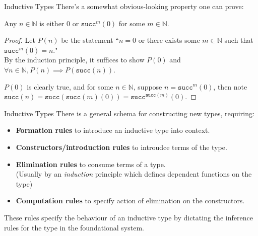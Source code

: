 \documentclass[10pt, aspectratio=169]{beamer}
\newcommand{\U}{\mathcal{U}}
\newcommand{\Prod}[2]{\prod_{(#1)}{#2}}
\newcommand{\0}{\mathbf{0}}
\newcommand{\1}{\mathbf{1}}
\newcommand{\2}{\mathbf{2}}
\newcommand{\N}{\mathbb{N}}
\begin{document}
\begin{frame}{Inductive Types}
  There's a somewhat obvious-looking property one can prove:
  \begin{theorem}
    Any $n \in \N$ is either $0$ or $\mathtt{succ}^m(0)$ for some $m \in \N$.
  \end{theorem}
  \begin{proof}
    Let $P(n)$ be the statement ``$n = 0$ or there exists some $m \in \N$ such that $\mathtt{succ}^m(0) = n.$" \\
    By the induction principle, it suffices to show $P(0)$ and $\forall n \in \N, P(n) \implies P(\mathtt{succ}(n))$.

    $P(0)$ is clearly true, and for some $n \in \N$, suppose $n = \mathtt{succ}^m(0)$, then note $\mathtt{succ}(n) = \mathtt{succ}(\mathtt{succ}(m)(0)) = \mathtt{succ}^{\mathtt{succ}(m)}(0)$.
  \end{proof}


\end{frame}


\begin{frame}{Inductive Types}
  There is a general schema for constructing new types, requiring:
  \begin{itemize}
    \item \textbf{Formation rules} to introduce an inductive type into context. 
    \item \textbf{Constructors/introduction rules} to introudce terms of the type.

    \item \textbf{Elimination rules} to consume terms of a type. \\
      (Usually by an \emph{induction} principle which defines dependent functions on the type)

    \item \textbf{Computation rules} to specify action of elimination on the constructors.

  \end{itemize}
  These rules specify the behaviour of an inductive type by dictating the inference rules for the type 
  in the foundational system.
\end{frame}
\end{document}
